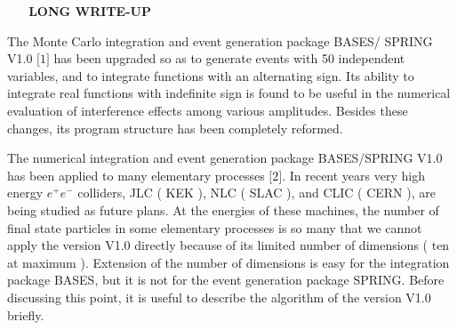 %
\newpage
\noindent
{\bf ~~~LONG WRITE-UP}
\bigskip
\par
The Monte Carlo integration and event generation package {\small BASES/ SPRING V1.0}
$\lbrack 1 \rbrack$ has been upgraded so as to generate events with 50 independent
variables, and  to integrate functions with  an
alternating sign. 
Its ability to integrate real functions with indefinite sign is
 found to be useful in the numerical evaluation of interference effects among
 various amplitudes.
Besides these changes, its program structure has been completely reformed.  
\par \vskip 1.0cm
\bigskip
\par
The numerical integration and event generation package {\small BASES/SPRING
 V1.0}  has been applied to many elementary processes $\lbrack
2 \rbrack$.
In recent years very high energy $e^+e^-$ colliders, {\small JLC ( KEK )}, {\small NLC 
( SLAC )}, and {\small CLIC ( CERN )}, are being studied as future plans.
At the energies of these machines, the number of final state particles in
some elementary processes is so many that we cannot apply the version {\small V1.0} 
directly because of its limited number of dimensions ( ten at maximum ).
Extension of the number of dimensions is easy for the integration package {\small
BASES}, but it is not for the event generation package {\small SPRING}. 
Before
discussing this point, it is useful to describe the algorithm of the version
{\small  V1.0} briefly.

